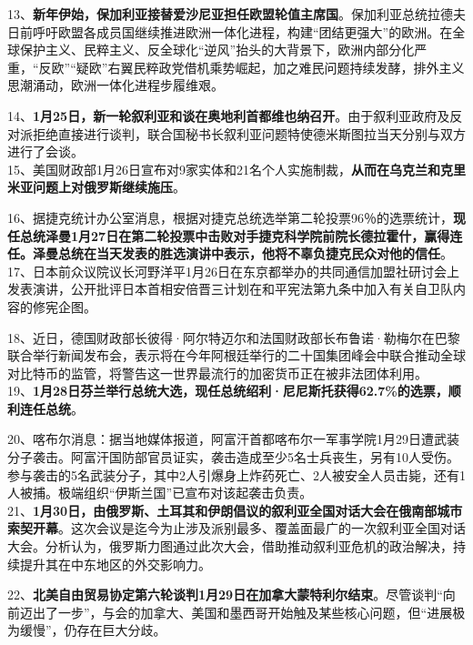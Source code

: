 13、{\textbf{新年伊始，保加利亚接替爱沙尼亚担任欧盟轮值主席国}}。保加利亚总统拉德夫日前呼吁欧盟各成员国继续推进欧洲一体化进程，构建``团结更强大''的欧洲。在全球保护主义、民粹主义、反全球化``逆风''抬头的大背景下，欧洲内部分化严重，``反欧''``疑欧''右翼民粹政党借机乘势崛起，加之难民问题持续发酵，排外主义思潮涌动，欧洲一体化进程步履维艰。

14、{\textbf{1月25日，新一轮叙利亚和谈在奥地利首都维也纳召开}}。由于叙利亚政府及反对派拒绝直接进行谈判，联合国秘书长叙利亚问题特使德米斯图拉当天分别与双方进行了会谈。\\
15、美国财政部1月26日宣布对9家实体和21名个人实施制裁，{\textbf{从而在乌克兰和克里米亚问题上对俄罗斯继续施压}}。

16、据捷克统计办公室消息，根据对捷克总统选举第二轮投票96％的选票统计，{\textbf{现任总统泽曼1月27日在第二轮投票中击败对手捷克科学院前院长德拉霍什，赢得连任。泽曼总统在当天发表的胜选演讲中表示，他将不辜负捷克民众对他的信任}}。\\
17、日本前众议院议长河野洋平1月26日在东京都举办的共同通信加盟社研讨会上发表演讲，公开批评日本首相安倍晋三计划在和平宪法第九条中加入有关自卫队内容的修宪企图。

18、近日，德国财政部长彼得·阿尔特迈尔和法国财政部长布鲁诺·勒梅尔在巴黎联合举行新闻发布会，表示将在今年阿根廷举行的二十国集团峰会中联合推动全球对比特币的监管，将警告这一世界最流行的加密货币正在被非法团体利用。\\
19、{\textbf{1月28日芬兰举行总统大选，现任总统绍利·尼尼斯托获得62.7\%的选票，顺利连任总统}}。

20、喀布尔消息：据当地媒体报道，阿富汗首都喀布尔一军事学院1月29日遭武装分子袭击。阿富汗国防部官员证实，袭击造成至少5名士兵丧生，另有10人受伤。参与袭击的5名武装分子，其中2人引爆身上炸药死亡、2人被安全人员击毙，还有1人被捕。极端组织``伊斯兰国''已宣布对该起袭击负责。\\
21、{\textbf{1月30日，由俄罗斯、土耳其和伊朗倡议的叙利亚全国对话大会在俄南部城市索契开幕}}。这次会议是迄今为止涉及派别最多、覆盖面最广的一次叙利亚全国对话大会。分析认为，俄罗斯力图通过此次大会，借助推动叙利亚危机的政治解决，持续提升其在中东地区的外交影响力。

22、{\textbf{北美自由贸易协定第六轮谈判1月29日在加拿大蒙特利尔结束}}。尽管谈判``向前迈出了一步''，与会的加拿大、美国和墨西哥开始触及某些核心问题，但``进展极为缓慢''，仍存在巨大分歧。
